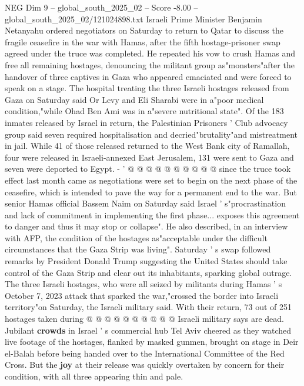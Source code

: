 \begin{textsample}{NEG Dim 9 – global\_south\_2025\_02 – Score -8.00 – global\_south\_2025\_02/121024898.txt}  \label{ex:f9_neg_184}
Israeli Prime Minister Benjamin Netanyahu ordered negotiators on Saturday to return to Qatar to discuss the fragile ceasefire in the war with Hamas, after the fifth hostage-prisoner swap agreed under the truce was completed.
He repeated his vow to crush Hamas and free all remaining hostages, denouncing the militant group as"monsters"after the handover of three captives in Gaza who appeared emaciated and were forced to speak on a stage.
The hospital treating the three Israeli hostages released from Gaza on Saturday said Or Levy and Eli Sharabi were in a"poor medical condition,"while Ohad Ben Ami was in a"severe nutritional state".
Of the 183 inmates released by Israel in return, the Palestinian Prisoners ' Club advocacy group said seven required hospitalisation and decried"brutality"and mistreatment in jail.
While 41 of those released returned to the West Bank city of Ramallah, four were released in Israeli-annexed East Jerusalem, 131 were sent to Gaza and seven were deported to Egypt. - ' @ @ @ @ @ @ @ @ @ @ since the truce took effect last month came as negotiations were set to begin on the next phase of the ceasefire, which is intended to pave the way for a permanent end to the war.
But senior Hamas official Bassem Naim on Saturday said Israel ' s"procrastination and lack of commitment in implementing the first phase... exposes this agreement to danger and thus it may stop or collapse".
He also described, in an interview with AFP, the condition of the hostages as"acceptable under the difficult circumstances that the Gaza Strip was living".
Saturday ' s swap followed remarks by President Donald Trump suggesting the United States should take control of the Gaza Strip and clear out its inhabitants, sparking global outrage.
The three Israeli hostages, who were all seized by militants during Hamas ' s October 7, 2023 attack that sparked the war,"crossed the border into Israeli territory"on Saturday, the Israeli military said.
With their return, 73 out of 251 hostages taken during @ @ @ @ @ @ @ @ @ @ Israeli military says are dead.
Jubilant \textbf{crowds} in Israel ' s commercial hub Tel Aviv cheered as they watched live footage of the hostages, flanked by masked gunmen, brought on stage in Deir el-Balah before being handed over to the International Committee of the Red Cross.
But the \textbf{joy} at their release was quickly overtaken by concern for their condition, with all three appearing thin and pale.

\end{textsample}
